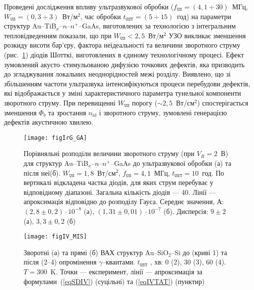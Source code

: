 Проведені дослідження впливу ультразвукової обробки
($f_\mathtt{US}=(4,1\div30)$~МГц, $W_\mathtt{US}=(0,3\div3)$~Вт/м$^2$, час обробки $t_\mathtt{UST}=(5\div15)$~год) на параметри структур
Au--TiB$_x$--$n$--$n^+$--GaAs, виготовлених
за технологією з інтегральним тепловідведенням
показали, що при $W_\mathtt{US}<2,5$~Вт/м$^2$ УЗО викликає зменшення розкиду висоти бар'єру, фактора неідеальності та величини зворотного струму (рис.~\ref{figIrG_GA})
діодів Шотткі, виготовлених в єдиному технологічному процесі.
Ефект зумовлений акусто--стимульованою дифузією точкових дефектів, яка призводить до згладжування локальних неоднорідностей межі розділу.
Виявлено, що зі збільшенням частоти ультразвука інтенсифікуються процеси перебудови дефектів, які відображається у зміні характеристичного  параметра тунельної компоненти зворотного
струму.
При перевищенні $W_\mathtt{US}$ порогу ($\sim2,5$~Вт/см$^2$) спостерігається зменшення $\Phi_b$ та зростання $n_\mathrm{id}$ і зворотного струму, зумовлені генерацією дефектів акустичною хвилею.

\begin{figure}
\center
\texttt{[image: figIrG\_GA]}%
\caption{\label{figIrG_GA}
Порівняльні розподіли величини зворотного струму (при $V_R=2$~В)
для структур Au--TiB$_x$--$n$--$n^+$--GaAs до ультразвукової обробки (а) та після неї(б).
$W_\mathtt{US}=1,8$~Вт/см$^2$, $f_\mathtt{US}=4,1$~МГц, $t_\mathtt{UST}=10$~год.
По вертикалі відкладена частка діодів, для яких струм перебуває у відповідному діапазоні.
Загальна кількість діодів --- 40.
Лінії --- апроксимація відповідно до розподілу Гауса.
Середнє значення, А:
$(2,8\pm0,2)\cdot10^{-8}$ (а),
$(1,31\pm0,01)\cdot10^{-7}$ (б).
Дисперсія:
$9\pm2$ (а),
$3,3\pm0,2$ (б)
\vspace{1em}
}
\end{figure}

\begin{figure}[b]
\center
\texttt{[image: figIV\_MIS]}%
\caption{\label{figIV_MIS}
Зворотні (а) та прямі (б) ВАХ структур Au--SiO$_2$--Si до (криві 1)
та після (2--4) опромінення $\gamma$--квантами.
$t_\mathtt{UST}$ , хв: 0 (2), 30 (3), 60 (4).
$T=300$~K.
Точки --- експеримент,
лінії --- апроксимація за формулами~(\ref{eqSDIV}) (суцільні) та (\ref{eqIVTAT}) (пунктир)
\vspace{1em}
}%
\end{figure}

